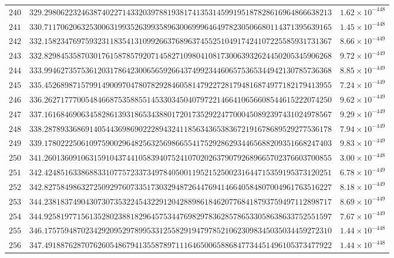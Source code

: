 \documentclass[12pt,reqno]{amsart}
\theoremstyle{remark}
\begin{document}
\begin{longtable}{clc}
$240$ & $329.2980622324638740227143320397881938174135314599195187828616964866638213$ & $1.62\times 10^{-448}$ \\
$241$ & $330.7117062063253006319935263993589630069996464978230506680114371395639165$ & $1.45\times 10^{-448}$ \\
$242$ & $332.1582347697593231183541310992663768963745525104917424107225585931731367$ & $8.66\times 10^{-449}$ \\
$243$ & $332.8298453587030176158785792071458271098041081730063932624450205345906268$ & $9.72\times 10^{-449}$ \\
$244$ & $333.9946273575361203178642300656592664374992344606575365344942130785736368$ & $8.85\times 10^{-449}$ \\
$245$ & $335.4526898715799149009704780782928460581479227281794816874977182179413955$ & $7.24\times 10^{-449}$ \\
$246$ & $336.2627177700548466875358855145330345040797221466410656608544615222074250$ & $9.62\times 10^{-449}$ \\
$247$ & $337.1616846906345828613931865343880172017352922477000450892397431024978567$ & $9.29\times 10^{-449}$ \\
$248$ & $338.2878933686914054436986902228943241185634365383672191678689529277536178$ & $7.94\times 10^{-449}$ \\
$249$ & $339.1780222506109759002964825632569866554175292862934465688209351668247403$ & $9.83\times 10^{-449}$ \\
$250$ & $341.2601360910631591043744105839407524107020263790792689665702376603700855$ & $3.00\times 10^{-448}$ \\
$251$ & $342.4248516338688331077572337349784050011952152500231644715359195373120251$ & $6.78\times 10^{-449}$ \\
$252$ & $342.8275849863272509297607335173032948726447694146640584807004961763516227$ & $8.18\times 10^{-449}$ \\
$253$ & $344.2381837490430730735322454322912042889861846207768418793759497112898717$ & $8.69\times 10^{-449}$ \\
$254$ & $344.9258197715613528023881829645753447698297836285786533058638633752551597$ & $7.67\times 10^{-449}$ \\
$255$ & $346.1757594870234292095297899533125582919479785210623098345035034459272310$ & $1.44\times 10^{-448}$ \\
$256$ & $347.4918876287076260548679413558789711164650065886847734451496105373477922$ & $1.44\times 10^{-448}$ \\

\end{longtable}
\end{document}
